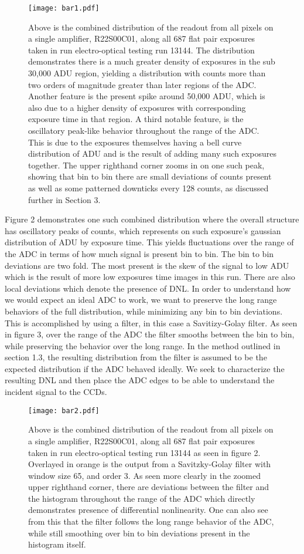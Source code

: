 \documentclass[11pt, letterpaper]{article}
\begin{document}
\begin{figure}
	\texttt{[image: bar1.pdf]}
	\caption{Above is the combined distribution of the readout from all pixels on a single amplifier, R22S00C01, along all 687 flat pair exposures taken in run electro-optical testing run 13144. The distribution demonstrates there is a much greater density of exposures in the sub 30,000 ADU region, yielding a distribution with counts more than two orders of magnitude greater than later regions of the ADC. Another feature is the present spike around 50,000 ADU, which is also due to a higher density of exposures with corresponding exposure time in that region. A third notable feature, is the oscillatory peak-like behavior throughout the range of the ADC. This is due to the exposures themselves having a bell curve distribution of ADU and is the result of adding many such exposures together. The upper righthand corner zooms in on one such peak, showing that bin to bin there are small deviations of counts present as well as some patterned downticks every 128 counts, as discussed further in Section 3.}
\end{figure}
\indent 

Figure 2 demonstrates one such combined distribution where the overall structure has oscillatory peaks of counts, which represents on such exposure's gaussian distribution of ADU by exposure time. 
This yields fluctuations over the range of the ADC in terms of how much signal is present bin to bin. 
The bin to bin deviations are two fold. 
The most present is the skew of the signal to low ADU which is the result of more low exposures time images in this run. 
There are also local deviations which denote the presence of DNL. 
In order to understand how we would expect an ideal ADC to work, we want to preserve the long range behaviors of the full distribution, while minimizing any bin to bin deviations. 
This is accomplished by using a filter, in this case a Savitizy-Golay filter. 
As seen in figure 3, over the range of the ADC the filter smooths between the bin to bin, while preserving the behavior over the long range. 
In the method outlined in section 1.3, the resulting distribution from the filter is assumed to be the expected distribution if the ADC behaved ideally. 
We seek to characterize the resulting DNL and then place the ADC edges to be able to understand the incident signal to the CCDs. 

\begin{figure}
	\texttt{[image: bar2.pdf]}
	\caption{Above is the combined distribution of the readout from all pixels on a single amplifier, R22S00C01, along all 687 flat pair exposures taken in run electro-optical testing run 13144 as seen in figure 2. Overlayed in orange is the output from a Savitzky-Golay filter with window size 65, and order 3. As seen more clearly in the zoomed upper righthand corner, there are deviations between the filter and the histogram throughout the range of the ADC which directly demonstrates presence of differential nonlinearity. One can also see from this that the filter follows the long range behavior of the ADC, while still smoothing over bin to bin deviations present in the histogram itself.}
\end{figure}
\end{document}
